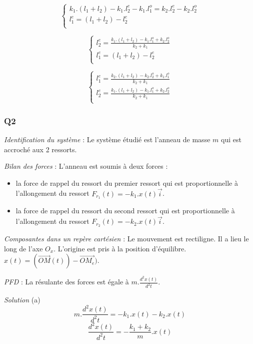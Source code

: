 \documentclass[]{book}
\theoremstyle{definition}
\begin{document}
$$
\left\{
\begin{array}{l}
 k_1.(l_{1} + l_{2}) - k_1.l^{e}_{2} - k_1.l^{o}_{1} = k_2.l^{e}_{2} - k_2.l^{o}_{2} \\
 l^{e}_{1}  = (l_{1} + l_{2}) - l^{e}_{2}\\
\end{array}
\right. 
$$

$$
\left\{
\begin{array}{l}
 l^{e}_{2} =  \frac{k_1.(l_{1} + l_{2}) - k_1.l^{o}_{1} + k_2.l^{o}_{2}}{k_2 + k_1} \\
 l^{e}_{1} = (l_{1} + l_{2}) - l^{e}_{2}\\
\end{array}
\right. 
$$

$$
\left\{
\begin{array}{l}
 l^{e}_{1} = \frac{k_2.(l_{1} + l_{2}) - k_2.l^{o}_{2} + k_1.l^{o}_{1}}{k_2 + k_1} \\
 l^{e}_{2} = \frac{k_1.(l_{1} + l_{2}) - k_1.l^{o}_{1} + k_2.l^{o}_{2}}{k_2 + k_1} \\
\end{array}
\right. 
$$


\subsubsection*{Q2}
\emph{Identification du syst\`eme} : Le syst\`eme \'etudi\'e est l'anneau de masse
$m$ qui est accroch\'e aux 2 ressorts.


\emph{Bilan des forces} : L'anneau est soumis \`a deux forces : 
\begin{itemize}
\item la force de rappel du ressort du premier ressort qui est proportionnelle \`a l'allongement
du ressort $F_{r_1}(t) = -k_1.x(t)\overrightarrow{i}$.
\item la force de rappel du ressort du second ressort qui est proportionnelle \`a l'allongement
du ressort $F_{r_2}(t) = -k_2.x(t)\overrightarrow{i}$.
\end{itemize}


\emph{Composantes dans un rep\`ere cart\'esien} : Le mouvement est rectiligne.
Il a lieu le long de l'axe $O_x$. L'origine est pris \`a la position d'\'equilibre. $x(t) = (\overrightarrow{OM}(t)) - \overrightarrow{OM_{e}})$.


\emph{PFD} : La r\'esulante des forces est \'egale \`a $m.\frac{d^2x(t)}{d^2t}$. 


\emph{Solution}
(a) \\
$$m.\frac{d^2x(t)}{d^2t} = -k_1.x(t)-k_2.x(t)$$
$$\frac{d^2x(t)}{d^2t} = -\frac{k_1+k_2}{m}.x(t)$$
\end{document}
